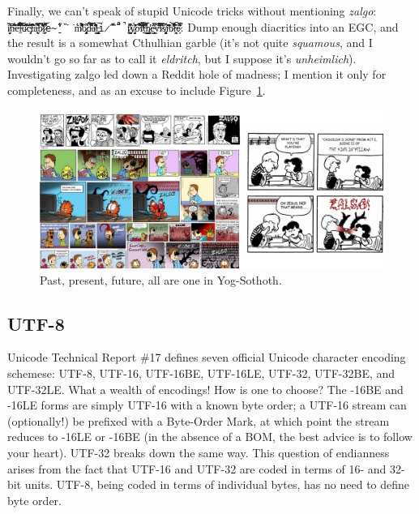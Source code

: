 Finally, we can't speak of stupid Unicode tricks without mentioning
\textit{zalgo}: \texttt{i̸̬̦͙̒̌̓͝n̴͛̓͋̈́͂̇̑̅̕e̵̎̈́̎̀̐̓͆͘͝l̴̠͛͂̃́̅̄̚͝u̷̾́̄̇́̎͂̚͝c̴̡̟̜̉̈́̋͂̈́̎t̵́͊̂̑̑̇̒̃̄å̵̰͎̫̅̿̏͂̽b̷̛͋̎́͛́͋̈͌l̷̰͎̫͐̑̈͛͆͝e̴̱̋̾̃̒̏͘͘̕m̸̆͋͌̍̉͆͌͛̓ȍ̷̡̜̭͙̞̣̎̚d̴̐̃͆̈́̽̔̐̀͝ä̸́̑̐̒͊̔̾́̕l̶̨̡̙̳̭̮̠̼͝i̷̋̆̌̿̎̃̋̚̚ṯ̷̱̫̺͗͒̔͆̄ẏ̷̡̛̮͈͑̓́͊ȏ̵͋̅́̋͒̐̇͝f̸̛̃͐͒̈̾̆̕͠t̶͈̱̠͋̑̊̿̇͘h̷̰͚̳̳̤͗̓͗̄e̴͇͙̜̿͐́̎̌͘ṽ̶̌̈́́́̈́͌͂͘i̷̛͊̒̏̄̀̅͠͝s̸̯̘͍̝͓̈́ͅͅì̵̃͊̇͗̄̋̇͘b̷̃̎̓͛̊̾͘̚̚l̶̯̼͎͉̎͛̆͠e̷̙͊̇̿͗̃͊̓́}. Dump enough
diacritics into an EGC, and the result is a somewhat Cthulhian garble (it's not
quite \textit{squamous}, and I wouldn't go so far as to call it
\textit{eldritch}, but I suppose it's \textit{unheimlich}). Investigating zalgo
led down a Reddit hole of madness; I mention it only for completeness, and as
an excuse to include Figure~\ref{fig:zalgo}.

\begin{figure}[H]
    \centering
    \includegraphics[width=.5\linewidth]{media/zalgo.png}
    \caption{Past, present, future, all are one in Yog-Sothoth.}
    \label{fig:zalgo}
\end{figure}

\subsection{UTF-8}
Unicode Technical Report \#17\cite{annex17} defines seven official Unicode
character encoding schemese: UTF-8, UTF-16, UTF-16BE, UTF-16LE, UTF-32, UTF-32BE,
and UTF-32LE. What a wealth of encodings! How is one to choose? The -16BE and
-16LE forms are simply UTF-16 with a known byte order; a UTF-16 stream can
(optionally!) be prefixed with a Byte-Order Mark, at which point the stream
reduces to -16LE or -16BE (in the absence of a BOM, the best advice is to follow
your heart). UTF-32 breaks down the same way. This question of endianness arises
from the fact that UTF-16 and UTF-32 are coded in terms of 16- and 32-bit units.
UTF-8, being coded in terms of individual bytes, has no need to define byte order.

